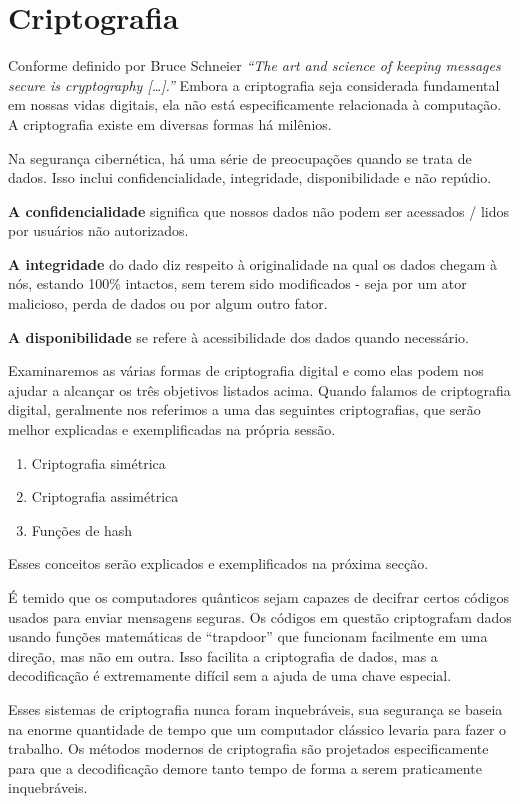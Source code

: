 \section{Criptografia}
Conforme definido por Bruce Schneier \textit{``The art and science of keeping messages secure is cryptography […].''} \cite{13} Embora a criptografia seja considerada fundamental em nossas vidas digitais, ela não está especificamente relacionada à computação. A criptografia existe em diversas formas há milênios.

Na segurança cibernética, há uma série de preocupações quando se trata de dados. Isso inclui confidencialidade, integridade, disponibilidade e não repúdio.

\textbf{A confidencialidade} significa que nossos dados não podem ser acessados / lidos por usuários não autorizados.

\textbf{A integridade} do dado diz respeito à originalidade na qual os dados chegam à nós, estando 100\% intactos, sem terem sido modificados - seja por um ator malicioso, perda de dados ou por algum outro fator. 

\textbf{A disponibilidade} se refere à acessibilidade dos dados quando necessário.

Examinaremos as várias formas de criptografia digital e como elas podem nos ajudar a alcançar os três objetivos listados acima. Quando falamos de criptografia digital, geralmente nos referimos a uma das seguintes criptografias, que serão melhor explicadas e exemplificadas na própria sessão.

\begin{enumerate}
  \item Criptografia simétrica
  \item Criptografia assimétrica
  \item Funções de hash
\end{enumerate}

Esses conceitos serão explicados e exemplificados na próxima secção.

É temido que os computadores quânticos sejam capazes de decifrar certos códigos usados para enviar mensagens seguras. Os códigos em questão criptografam dados usando funções matemáticas de ``trapdoor'' que funcionam facilmente em uma direção, mas não em outra. Isso facilita a criptografia de dados, mas a decodificação é extremamente difícil sem a ajuda de uma chave especial.

Esses sistemas de criptografia nunca foram inquebráveis, sua segurança se baseia na enorme quantidade de tempo que um computador clássico levaria para fazer o trabalho. Os métodos modernos de criptografia são projetados especificamente para que a decodificação demore tanto tempo de forma a serem praticamente inquebráveis.

